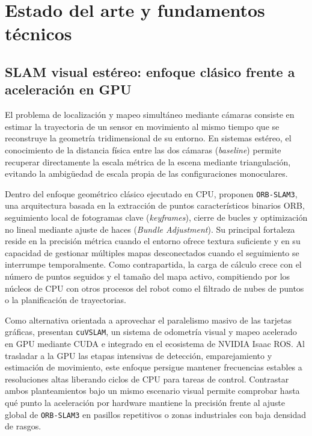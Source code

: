 \chapter{Estado del arte y fundamentos técnicos}
\label{sec:estado_arte}

\section{SLAM visual estéreo: enfoque clásico frente a aceleración en GPU}
\label{sec:slam_visual_fundamentos}

El problema de localización y mapeo simultáneo mediante cámaras consiste en estimar la trayectoria de un sensor en movimiento al mismo tiempo que se reconstruye la geometría tridimensional de su entorno. En sistemas estéreo, el conocimiento de la distancia física entre las dos cámaras (\textit{baseline}) permite recuperar directamente la escala métrica de la escena mediante triangulación, evitando la ambigüedad de escala propia de las configuraciones monoculares.

Dentro del enfoque geométrico clásico ejecutado en CPU, \textcite{campos2021orbslam3} proponen \texttt{ORB-SLAM3}, una arquitectura basada en la extracción de puntos característicos binarios ORB, seguimiento local de fotogramas clave (\textit{keyframes}), cierre de bucles y optimización no lineal mediante ajuste de haces (\textit{Bundle Adjustment}). Su principal fortaleza reside en la precisión métrica cuando el entorno ofrece textura suficiente y en su capacidad de gestionar múltiples mapas desconectados cuando el seguimiento se interrumpe temporalmente. Como contrapartida, la carga de cálculo crece con el número de puntos seguidos y el tamaño del mapa activo, compitiendo por los núcleos de CPU con otros procesos del robot como el filtrado de nubes de puntos o la planificación de trayectorias.

Como alternativa orientada a aprovechar el paralelismo masivo de las tarjetas gráficas, \textcite{korovko2025cuvslam} presentan \texttt{cuVSLAM}, un sistema de odometría visual y mapeo acelerado en GPU mediante CUDA e integrado en el ecosistema de NVIDIA Isaac ROS. Al trasladar a la GPU las etapas intensivas de detección, emparejamiento y estimación de movimiento, este enfoque persigue mantener frecuencias estables a resoluciones altas liberando ciclos de CPU para tareas de control. Contrastar ambos planteamientos bajo un mismo escenario visual permite comprobar hasta qué punto la aceleración por hardware mantiene la precisión frente al ajuste global de \texttt{ORB-SLAM3} en pasillos repetitivos o zonas industriales con baja densidad de rasgos.


